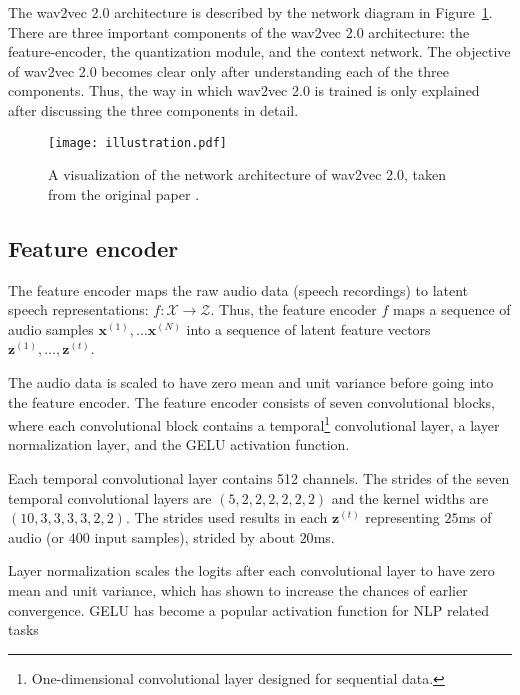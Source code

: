 The wav2vec 2.0 architecture is described by the network diagram in Figure~\ref{wav2vec2_architecture}.
There are three important components of the wav2vec 2.0 architecture:
the feature-encoder, the quantization module, and the context network.
The objective of wav2vec 2.0 becomes clear only after understanding each of the three
components. Thus, the way in which wav2vec 2.0 is trained is only explained after discussing
the three components in detail.

\begin{figure}
    \centering
    \captionsetup{justification=centering}
    \texttt{[image: illustration.pdf]}
    \caption{A visualization of the network architecture of wav2vec 2.0, taken from the original paper \cite{baevski2020wav2vec}.}
    \label{wav2vec2_architecture}
\end{figure}



\subsection{Feature encoder}
The feature encoder maps the raw audio data (speech recordings) to latent speech representations: $f: \mathcal{X} \rightarrow \mathcal{Z}$.
Thus, the feature encoder $f$ maps a sequence of audio samples $\mathbf{x}^{(1)}, \dots \mathbf{x}^{(N)}$ into a sequence of latent feature vectors $\mathbf{z}^{(1)}, \dots, \mathbf{z}^{(t)}$.

The audio data is scaled to have zero mean and unit variance before going into the feature encoder. 
The feature encoder consists of seven convolutional blocks, where each convolutional block contains a temporal\footnote{One-dimensional convolutional layer designed for sequential data.} convolutional layer, 
a layer normalization layer, and the GELU activation function.

Each temporal convolutional layer contains 512 channels. 
The strides of the seven temporal convolutional layers are $(5,2,2,2,2,2,2)$ and the kernel widths are $(10,3,3,3,3,2,2)$.
The strides used results in each $\mathbf{z}^{(t)}$ representing $25$ms of audio (or $400$ input samples),
strided by about $20$ms.

Layer normalization scales the logits after each convolutional layer to have zero mean and unit variance, which has shown to increase the chances of earlier convergence.
GELU has become a popular activation function for NLP related tasks



